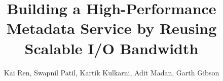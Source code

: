 \documentclass[conference]{acm_proc}
\begin{document}
\date{}

\title{Building a High-Performance Metadata Service by Reusing Scalable I/O Bandwidth}


\author{
\alignauthor
Kai Ren, Swapnil Patil, Kartik Kulkarni, Adit Madan, Garth Gibson \\
\\
}

\maketitle

\begin{abstract}

\end{abstract}









\end{document}
